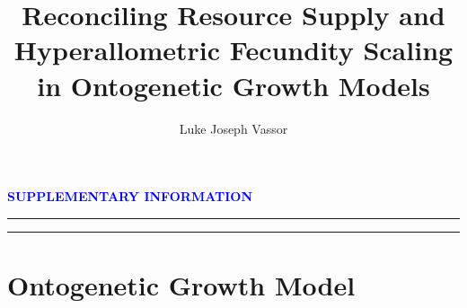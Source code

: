 \documentclass[a4paper]{article} %
\title{Reconciling Resource Supply and Hyperallometric Fecundity Scaling in Ontogenetic Growth Models}
\author{Luke Joseph Vassor}
\begin{document}
\begin{titlepage}
    
    \makeatletter
    \linespread{1.5} %
    {\huge\bfseries\textcolor{blue}{SUPPLEMENTARY INFORMATION}\par}
    \vspace{0.1cm}
    \hrule
    \vspace{0.1cm}
    \hrule
    \center %
    \vspace{2cm}
        
    \vspace{2cm} %
    \tableofcontents
\end{titlepage}


\section{Ontogenetic Growth Model}
\end{document}
